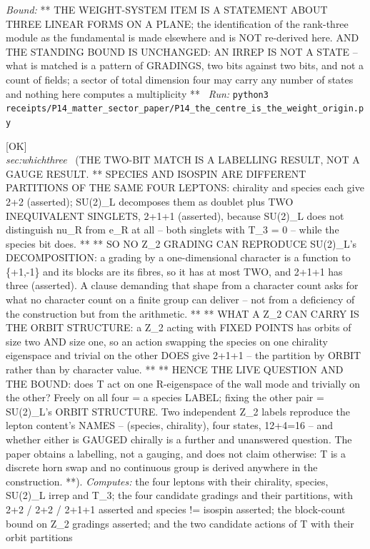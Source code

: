 \begin{description}
 \emph{Bound:} ** THE WEIGHT-SYSTEM ITEM IS A STATEMENT ABOUT THREE LINEAR FORMS ON A PLANE; the identification of the rank-three module as the fundamental is made elsewhere and is NOT re-derived here. AND THE STANDING BOUND IS UNCHANGED: AN IRREP IS NOT A STATE -- what is matched is a pattern of GRADINGS, two bits against two bits, and not a count of fields; a sector of total dimension four may carry any number of states and nothing here computes a multiplicity **
\ \emph{Run:} \texttt{python3 receipts/P14\_matter\_sector\_paper/P14\_the\_centre\_is\_the\_weight\_origin.py}
\item[\label{rcpt:P14_a_labelling_not_a_gauging}\texttt{P14\_a\_labelling\_not\_a\_gauging}]\hfill\textsf{[OK]}\\
\textit{sec:whichthree} \ (THE TWO-BIT MATCH IS A LABELLING RESULT, NOT A GAUGE RESULT. ** SPECIES AND ISOSPIN ARE DIFFERENT PARTITIONS OF THE SAME FOUR LEPTONS: chirality and species each give 2+2 (asserted); SU(2)\_L decomposes them as doublet plus TWO INEQUIVALENT SINGLETS, 2+1+1 (asserted), because SU(2)\_L does not distinguish nu\_R from e\_R at all -- both singlets with T\_3 = 0 -- while the species bit does. ** ** SO NO Z\_2 GRADING CAN REPRODUCE SU(2)\_L's DECOMPOSITION: a grading by a one-dimensional character is a function to \{+1,-1\} and its blocks are its fibres, so it has at most TWO, and 2+1+1 has three (asserted). A clause demanding that shape from a character count asks for what no character count on a finite group can deliver -- not from a deficiency of the construction but from the arithmetic. ** ** WHAT A Z\_2 CAN CARRY IS THE ORBIT STRUCTURE: a Z\_2 acting with FIXED POINTS has orbits of size two AND size one, so an action swapping the species on one chirality eigenspace and trivial on the other DOES give 2+1+1 -- the partition by ORBIT rather than by character value. ** ** HENCE THE LIVE QUESTION AND THE BOUND: does T act on one R-eigenspace of the wall mode and trivially on the other? Freely on all four = a species LABEL; fixing the other pair = SU(2)\_L's ORBIT STRUCTURE. Two independent Z\_2 labels reproduce the lepton content's NAMES -- (species, chirality), four states, 12+4=16 -- and whether either is GAUGED chirally is a further and unanswered question. The paper obtains a labelling, not a gauging, and does not claim otherwise: T is a discrete horn swap and no continuous group is derived anywhere in the construction. **). 
\emph{Computes:} the four leptons with their chirality, species, SU(2)\_L irrep and T\_3; the four candidate gradings and their partitions, with 2+2 / 2+2 / 2+1+1 asserted and species != isospin asserted; the block-count bound on Z\_2 gradings asserted; and the two candidate actions of T with their orbit partitions

\end{description}
